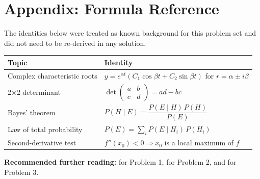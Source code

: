 
\section*{Appendix: Formula Reference}

The identities below were treated as known background for this problem set
and did not need to be re-derived in any solution.

\begin{center}
\renewcommand{\arraystretch}{1.3}
\begin{tabular}{@{}p{4.6cm}p{7.3cm}@{}}
\toprule
\textbf{Topic} & \textbf{Identity} \\
\midrule
Complex characteristic roots &
  $y = e^{\alpha t}(C_1\cos\beta t + C_2\sin\beta t)$ for $r = \alpha \pm i\beta$ \\
2$\times$2 determinant &
  $\det\begin{pmatrix} a & b \\{} c & d \end{pmatrix} = ad - bc$ \\
Bayes' theorem &
  $P(H\mid E) = \dfrac{P(E\mid H)\,P(H)}{P(E)}$ \\
Law of total probability &
  $P(E) = \sum_i P(E\mid H_i)\,P(H_i)$ \\
Second-derivative test &
  $f''(x_0) < 0 \Rightarrow x_0$ is a local maximum of $f$ \\
\bottomrule
\end{tabular}
\end{center}

\vspace{0.6cm}
\noindent\textbf{Recommended further reading:} \cite{boyce2017elementary}
for Problem 1, \cite{strang2016linear} for Problem 2, and
\cite{ross2019probability} for Problem 3.



